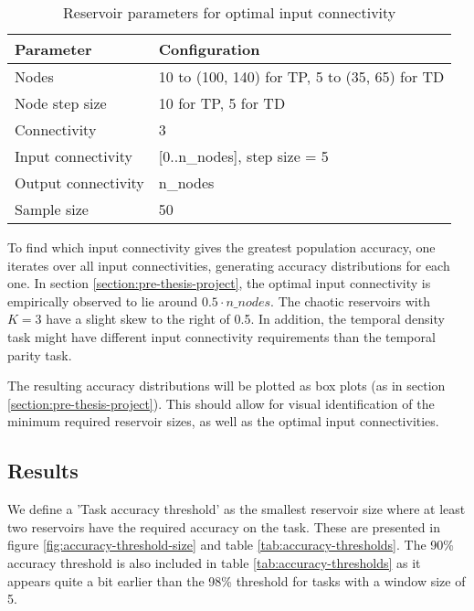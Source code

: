 \begin{table}[ht]
    \centering
    \caption{Reservoir parameters for optimal input connectivity}
    \label{tab:ic-reservoir-parameters}
    \begin{tabular}{ll}
        \hline
        \textbf{Parameter} & \textbf{Configuration} \\
        \hline
        \hline
        Nodes               & 10 to (100, 140) for TP, 5 to (35, 65) for TD \\
        Node step size      & 10 for TP, 5 for TD \\
        Connectivity        & 3                              \\
        Input connectivity  & [0..n\_nodes], step size = 5   \\
        Output connectivity & n\_nodes                       \\
        Sample size         & 50 \\
        \hline
    \end{tabular}
\end{table}

To find which input connectivity gives the greatest population accuracy,
one iterates over all input connectivities, generating accuracy distributions for each one.
In section \ref{section:pre-thesis-project},
the optimal input connectivity is empirically observed to lie around $ 0.5 \cdot n\_nodes $.
The chaotic reservoirs with $K=3$ have a slight skew to the right of 0.5.
In addition,
the temporal density task might have different input connectivity requirements than the temporal parity task.

The resulting accuracy distributions will be plotted as box plots (as in section \ref{section:pre-thesis-project}).
This should allow for visual identification of the minimum required reservoir sizes,
as well as the optimal input connectivities.

\subsection{Results}
\label{subsection:reservoir_size-input_connectivity:results}

We define a 'Task accuracy threshold' as the smallest reservoir size where at least two reservoirs have the required accuracy on the task.
These are presented in figure \ref{fig:accuracy-threshold-size} and table \ref{tab:accuracy-thresholds}.
The 90\% accuracy threshold is also included in table \ref{tab:accuracy-thresholds} as it appears quite a bit earlier than the 98\% threshold for tasks with a window size of 5.

